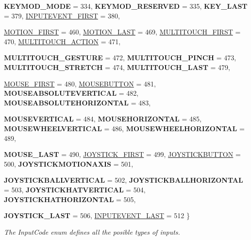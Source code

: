 \begin{DoxyCompactItemize}
{\bfseries KEYMOD\_\-MODE} =  334, 
{\bfseries KEYMOD\_\-RESERVED} =  335, 
{\bfseries KEY\_\-LAST} =  379, 
\hyperlink{classMetaCode_a7390e6f58e25c0ce377bba4e63081b24aa27e8c7d5dc3cc1d726ae82aef44d21c}{INPUTEVENT\_\-FIRST} =  380, 
\par
\hyperlink{classMetaCode_a7390e6f58e25c0ce377bba4e63081b24a21ee5ef5ddcbacbb4a90990ca56ee0a3}{MOTION\_\-FIRST} =  460, 
\hyperlink{classMetaCode_a7390e6f58e25c0ce377bba4e63081b24a1311c6065d4176f097d494bc33001b45}{MOTION\_\-LAST} =  469, 
\hyperlink{classMetaCode_a7390e6f58e25c0ce377bba4e63081b24aae6fbdfa76ec071a3b86d3eec35efa3b}{MULTITOUCH\_\-FIRST} =  470, 
\hyperlink{classMetaCode_a7390e6f58e25c0ce377bba4e63081b24a424167ec6d1df3c1d8ebf5d8fc458387}{MULTITOUCH\_\-ACTION} =  471, 
\par
{\bfseries MULTITOUCH\_\-GESTURE} =  472, 
{\bfseries MULTITOUCH\_\-PINCH} =  473, 
{\bfseries MULTITOUCH\_\-STRETCH} =  474, 
{\bfseries MULTITOUCH\_\-LAST} =  479, 
\par
\hyperlink{classMetaCode_a7390e6f58e25c0ce377bba4e63081b24a98454cf025e1b11ac8978c4b493582c4}{MOUSE\_\-FIRST} =  480, 
\hyperlink{classMetaCode_a7390e6f58e25c0ce377bba4e63081b24a90e6bf109b0decae5cc828ebc5934dfa}{MOUSEBUTTON} =  481, 
{\bfseries MOUSEABSOLUTEVERTICAL} =  482, 
{\bfseries MOUSEABSOLUTEHORIZONTAL} =  483, 
\par
{\bfseries MOUSEVERTICAL} =  484, 
{\bfseries MOUSEHORIZONTAL} =  485, 
{\bfseries MOUSEWHEELVERTICAL} =  486, 
{\bfseries MOUSEWHEELHORIZONTAL} =  489, 
\par
{\bfseries MOUSE\_\-LAST} =  490, 
\hyperlink{classMetaCode_a7390e6f58e25c0ce377bba4e63081b24aa3222db6ab303f525a1a0c87603d806c}{JOYSTICK\_\-FIRST} =  499, 
\hyperlink{classMetaCode_a7390e6f58e25c0ce377bba4e63081b24ab52ae2c161faf882271ec71ded86501f}{JOYSTICKBUTTON} =  500, 
{\bfseries JOYSTICKMOTIONAXIS} =  501, 
\par
{\bfseries JOYSTICKBALLVERTICAL} =  502, 
{\bfseries JOYSTICKBALLHORIZONTAL} =  503, 
{\bfseries JOYSTICKHATVERTICAL} =  504, 
{\bfseries JOYSTICKHATHORIZONTAL} =  505, 
\par
{\bfseries JOYSTICK\_\-LAST} =  506, 
\hyperlink{classMetaCode_a7390e6f58e25c0ce377bba4e63081b24ad1ca5de26bcaae04a631fdaa13e5749f}{INPUTEVENT\_\-LAST} =  512
 \}
\begin{DoxyCompactList}\small\item\em The InputCode enum defines all the posible types of inputs. \item\end{DoxyCompactList}\item 

\end{DoxyCompactItemize}
